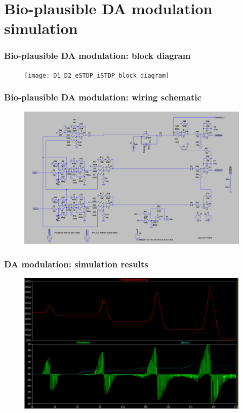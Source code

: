 \documentclass[12pt, aspectratio=169]{beamer}
\begin{document}
\section{Bio-plausible DA modulation simulation}

\begin{frame}
\frametitle{Bio-plausible DA modulation: block diagram}
\begin{figure}
\texttt{[image: D1\_D2\_eSTDP\_iSTDP\_block\_diagram]}
\end{figure}
\end{frame}


\begin{frame}
\frametitle{Bio-plausible DA modulation: wiring schematic}
\begin{figure}
\includegraphics[width=0.85\linewidth]{da_modulation_sch}
\end{figure}
\end{frame}


\begin{frame}
\frametitle{DA modulation: simulation results}
\begin{figure}
\includegraphics[width=0.8\linewidth]{da_modulation}
\end{figure}
\end{frame}
\end{document}
